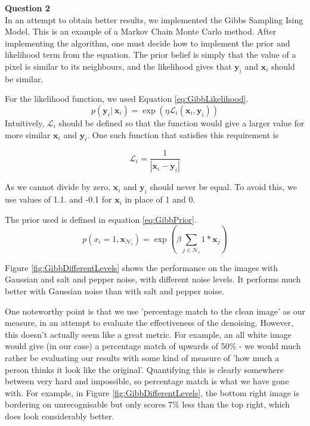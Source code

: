 \documentclass[10pt, a4paper, twocolumn]{article} %
\begin{document}
\noindent\textbf{Question 2}\\
In an attempt to obtain better results, we implemented the Gibbs Sampling Ising Model. This is an example of a Markov Chain Monte Carlo method. After implementing the algorithm, one must decide how to implement the prior and likelihood term from the equation. The prior belief is simply that the value of a pixel is similar to its neighbours, and the likelihood gives that $\textbf{y}_i$ and $\textbf{x}_i$ should be similar. 


For the likelihood function, we used Equation \ref{eq:GibbLikelihood}.
\begin{equation}
    p(\textbf{y}_i |\ \textbf{x}_i) = \exp(\eta \mathcal{L}_i (\textbf{x}_i, \textbf{y}_i))
    \label{eq:GibbLikelihood}
\end{equation}
Intuitively, $\mathcal{L}_i$ should be defined so that the function would give a larger value for more similar $\textbf{x}_i$ and $\textbf{y}_i$. One such function that satisfies this requirement is 

\begin{equation}
    \mathcal{L}_i = \frac{1}{|\textbf{x}_i - \textbf{y}_i|}
\end{equation}

As we cannot divide by zero, $\textbf{x}_i$ and $\textbf{y}_i$ should never be equal. To avoid this, we use values of 1.1. and -0.1 for $\textbf{x}_i$ in place of 1 and 0.

The prior used is defined in equation \ref{eq:GibbPrior}.
\begin{equation}
    \label{eq:GibbPrior}
    p(x_i = 1, \textbf{x}_\mathcal{N}_i) = \exp\left({\beta \sum_{j\in\mathcal{N}_i} 1 * \textbf{x}_ j}\right)
\end{equation}

Figure \ref{fig:GibbDifferentLevels} shows the performance on the images with Gaussian and salt and pepper noise, with different noise levels. It performs much better with Gaussian noise than with salt and pepper noise.

One noteworthy point is that we use 'percentage match to the clean image' as our measure, in an attempt to evaluate the effectiveness of the denoising. However, this doesn't actually seem like a great metric. For example, an all white image would give (in our case) a percentage match of upwards of 50\% - we would much rather be evaluating our results with some kind of measure of 'how much a person thinks it look like the original'. Quantifying this is clearly somewhere between very hard and impossible, so percentage match is what we have gone with. For example, in Figure \ref{fig:GibbDifferentLevels}, the bottom right image is bordering on unrecognisable but only scores 7\% less than the top right, which does look considerably better. \\
\end{document}
